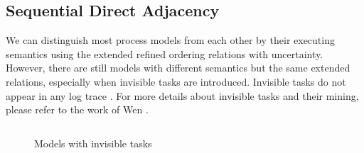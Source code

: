 \documentclass{llncs}
\begin{document}
\subsection{Sequential Direct Adjacency}\label{subsec:sda}
We can distinguish most process models from each other by their executing semantics using the extended refined ordering relations with uncertainty. However, there are still models with different semantics but the same extended relations, especially when invisible tasks are introduced. Invisible tasks do not appear in any log trace \cite{de2003workflow} . For more details about invisible tasks and their mining, please refer to the work of Wen \cite{wen2007mining}.

\begin{figure}[htb]
	\begin{minipage}[b]{0.5\textwidth}
		\centering
		\caption{Models with invisible tasks}
		\label{fig:sdaExample}
	\end{minipage}%
	\begin{minipage}[b]{0.5\textwidth}
		\centering
		\begin{tabular}{c|c|c|c|c} \hline

\end{tabular}
\end{minipage}
\end{figure}
\end{document}
